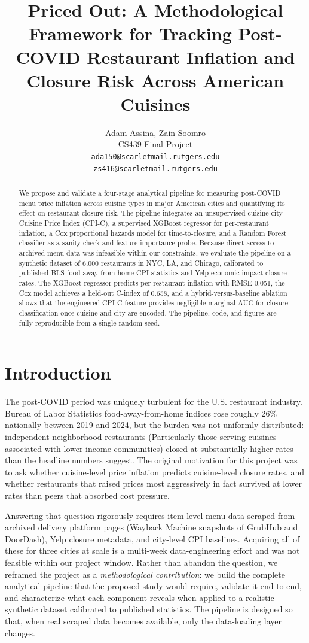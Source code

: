 \documentclass{article}
\title{Priced Out: A Methodological Framework for Tracking Post-COVID Restaurant Inflation and Closure Risk Across American Cuisines}
\author{%
  Adam Assina, Zain Soomro\\
  CS439 Final Project\\
  \texttt{ada150@scarletmail.rutgers.edu}\\
  \texttt{zs416@scarletmail.rutgers.edu}\\
}
\begin{document}
\maketitle

\begin{abstract}
We propose and validate a four-stage analytical pipeline for measuring post-COVID menu price inflation across cuisine types in major American cities and quantifying its effect on restaurant closure risk. The pipeline integrates an unsupervised cuisine-city Cuisine Price Index (CPI-C), a supervised XGBoost regressor for per-restaurant inflation, a Cox proportional hazards model for time-to-closure, and a Random Forest classifier as a sanity check and feature-importance probe. Because direct access to archived menu data was infeasible within our constraints, we evaluate the pipeline on a synthetic dataset of 6{,}000 restaurants in NYC, LA, and Chicago, calibrated to published BLS food-away-from-home CPI statistics and Yelp economic-impact closure rates. The XGBoost regressor predicts per-restaurant inflation with RMSE 0.051, the Cox model achieves a held-out C-index of 0.658, and a hybrid-versus-baseline ablation shows that the engineered CPI-C feature provides negligible marginal AUC for closure classification once cuisine and city are encoded. The pipeline, code, and figures are fully reproducible from a single random seed.
\end{abstract}

\section{Introduction}

The post-COVID period was uniquely turbulent for the U.S. restaurant industry. Bureau of Labor Statistics food-away-from-home indices rose roughly 26\% nationally between 2019 and 2024, but the burden was not uniformly distributed: independent neighborhood restaurants (Particularly those serving cuisines associated with lower-income communities) closed at substantially higher rates than the headline numbers suggest. The original motivation for this project was to ask whether cuisine-level price inflation predicts cuisine-level closure rates, and whether restaurants that raised prices most aggressively in fact survived at lower rates than peers that absorbed cost pressure.

Answering that question rigorously requires item-level menu data scraped from archived delivery platform pages (Wayback Machine snapshots of GrubHub and DoorDash), Yelp closure metadata, and city-level CPI baselines. Acquiring all of these for three cities at scale is a multi-week data-engineering effort and was not feasible within our project window. Rather than abandon the question, we reframed the project as a \emph{methodological contribution}: we build the complete analytical pipeline that the proposed study would require, validate it end-to-end, and characterize what each component reveals when applied to a realistic synthetic dataset calibrated to published statistics. The pipeline is designed so that, when real scraped data becomes available, only the data-loading layer changes.
\end{document}
